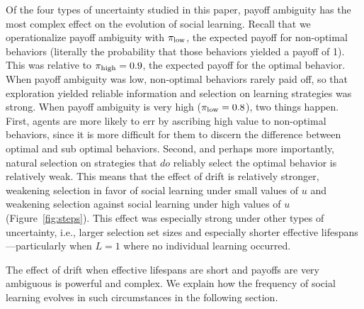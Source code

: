 \documentclass[letterpaper,11.5pt]{scrartcl}
\newcommand{\cm}[1]{{\textcolor{mypurple} {({\tiny CM:} #1)}}}
\begin{document}
Of the four types of uncertainty studied in this paper, payoff ambiguity has the most complex effect on the evolution of social learning. Recall that we operationalize payoff ambiguity with $\pi_{\mathrm{low}}$, the expected payoff for non-optimal behaviors (literally the probability that those behaviors yielded a payoff of 1). This was relative to $\pi_{\mathrm{high}} = 0.9$, the expected payoff for the optimal behavior. When payoff ambiguity was low, non-optimal behaviors rarely paid off, so that exploration yielded reliable information and selection on learning strategies was  strong. When payoff ambiguity is very high ($\pi_{\mathrm{low}} = 0.8$), two things happen. First, agents are more likely to err by ascribing high value to non-optimal behaviors, since it is more difficult for them to discern the difference between optimal and sub optimal behaviors. Second, and perhaps more importantly, natural selection on strategies that $do$ reliably select the optimal behavior is relatively weak. This means that the effect of drift is relatively stronger, weakening selection in favor of social learning under small values of $u$ and weakening selection against social learning under high values of $u$ (Figure~\ref{fig:steps}). This effect was especially strong under other types of uncertainty, i.e., larger selection set sizes and especially shorter effective lifespans---particularly when $L=1$ where no individual learning occurred. 

The effect of drift when effective lifespans are short and payoffs are very ambiguous is powerful and complex. We explain how the frequency of social learning evolves in such circumstances in the following section.



\end{document}
